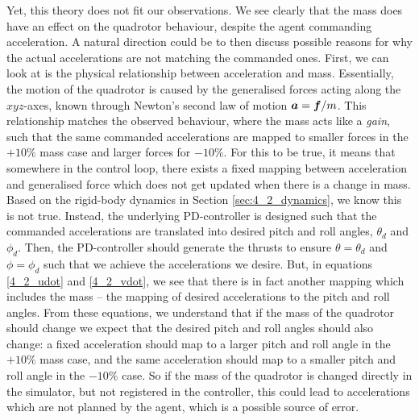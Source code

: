 Yet, this theory does not fit our observations. We see clearly that the mass does have an effect on the quadrotor behaviour, despite the agent commanding acceleration. A natural direction could be to then discuss possible reasons for why the actual accelerations are not matching the commanded ones. First, we can look at is the physical relationship between acceleration and mass. 
Essentially, the motion of the quadrotor is caused by the generalised forces acting along the $xyz$-axes, known through Newton's second law of motion ${\boldsymbol{a}} = \boldsymbol{f}/m$. This relationship matches the observed behaviour, where the mass acts like a \textit{gain}, such that the same commanded accelerations are mapped to smaller forces in the $+10\%$ mass case and larger forces for $-10\%$. 
For this to be true, it means that somewhere in the control loop, there exists a fixed mapping between acceleration and generalised force which does not get updated when there is a change in mass. Based on the rigid-body dynamics in Section \ref{sec:4_2_dynamics}, we know this is not true. Instead, the underlying PD-controller is designed such that the commanded accelerations are translated into desired pitch and roll angles, $\theta_d$ and $\phi_d$. Then, the PD-controller should generate the thrusts to ensure $\theta = \theta_d$ and $\phi = \phi_d$ such that we achieve the accelerations we desire. But, in equations \eqref{4_2_udot} and \eqref{4_2_vdot}, we see that there is in fact another mapping which includes the mass -- the mapping of desired accelerations to the pitch and roll angles. From these equations, we understand that if the mass of the quadrotor should change we expect that the desired pitch and roll angles should also change: a fixed acceleration should map to a larger pitch and roll angle in the $+10\%$ mass case, and the same acceleration should map to a smaller pitch and roll angle in the $-10\%$ case.
So if the mass of the quadrotor is changed directly in the simulator, but not registered in the controller, this could lead to accelerations which are not planned by the agent, which is a possible source of error.

